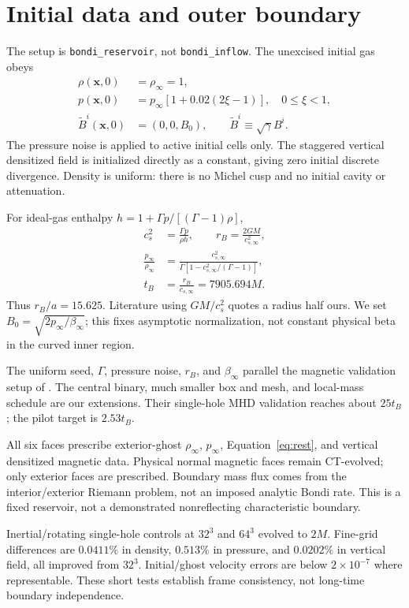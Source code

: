 \documentclass[twocolumn,anonymous]{aastex701}
\newcommand{\Btilde}{\widetilde{B}}
\begin{document}
\section{Initial data and outer boundary}\label{sec:initial}
The setup is \texttt{bondi\_reservoir}, not \texttt{bondi\_inflow}. The unexcised initial gas obeys
\begin{align}
 \rho(\boldsymbol x,0)&=\rho_\infty=1,\nonumber\\
 p(\boldsymbol x,0)&=p_\infty[1+0.02(2\xi-1)],\quad0\leq\xi<1,\nonumber\\
 \Btilde^i(\boldsymbol x,0)&=(0,0,B_0),\qquad
 \Btilde^i\equiv\sqrt{\gamma}B^i.\label{eq:seed}
\end{align}
The pressure noise is applied to active initial cells only. The staggered vertical densitized field is initialized directly as a constant, giving zero initial discrete divergence. Density is uniform: there is no Michel cusp and no initial cavity or attenuation.

For ideal-gas enthalpy $h=1+\Gamma p/[(\Gamma-1)\rho]$,
\begin{align}
 c_s^2&=\frac{\Gamma p}{\rho h},\qquad r_B=\frac{2GM}{c_{s,\infty}^2},\nonumber\\
 \frac{p_\infty}{\rho_\infty}&=\frac{c_{s,\infty}^2}{\Gamma[1-c_{s,\infty}^2/(\Gamma-1)]},\nonumber\\
 t_B&=\frac{r_B}{c_{s,\infty}}=7905.694M.\label{eq:bondi}
\end{align}
Thus $r_B/a=15.625$. Literature using $GM/c_s^2$ quotes a radius half ours. We set $B_0=\sqrt{2p_\infty/\beta_\infty}$; this fixes asymptotic normalization, not constant physical beta in the curved inner region.

The uniform seed, $\Gamma$, pressure noise, $r_B$, and $\beta_\infty$ parallel the magnetic validation setup of \citet{Guo2025}. The central binary, much smaller box and mesh, and local-mass schedule are our extensions. Their single-hole MHD validation reaches about $25t_B$; the pilot target is $2.53t_B$.

All six faces prescribe exterior-ghost $\rho_\infty$, $p_\infty$, Equation~\ref{eq:rest}, and vertical densitized magnetic data. Physical normal magnetic faces remain CT-evolved; only exterior faces are prescribed. Boundary mass flux comes from the interior/exterior Riemann problem, not an imposed analytic Bondi rate. This is a fixed reservoir, not a demonstrated nonreflecting characteristic boundary.

Inertial/rotating single-hole controls at $32^3$ and $64^3$ evolved to $2M$. Fine-grid differences are $0.0411\%$ in density, $0.513\%$ in pressure, and $0.0202\%$ in vertical field, all improved from $32^3$. Initial/ghost velocity errors are below $2\times10^{-7}$ where representable. These short tests establish frame consistency, not long-time boundary independence.
\end{document}
